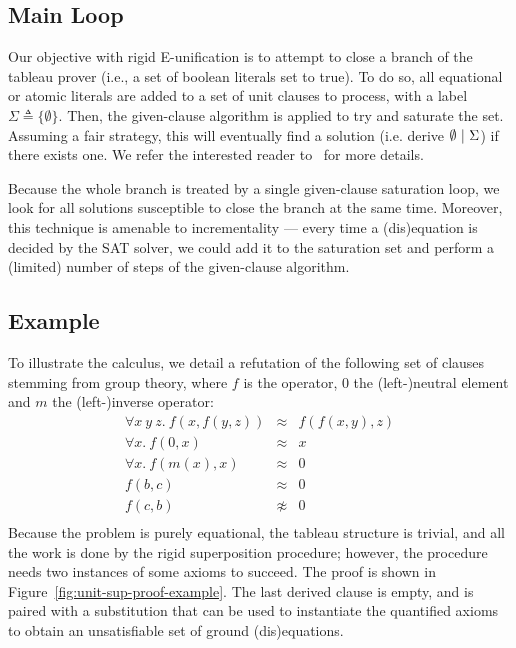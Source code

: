 
\subsection{Main Loop}

Our objective with rigid E-unification is to attempt to close a branch
of the tableau prover (i.e., a set of boolean literals set to true).
To do so, all equational or atomic literals are added to a set of unit clauses
to process, with a label $\Sigma \triangleq \{ \emptyset \}$.
Then, the given-clause algorithm is applied to try and saturate the set.
Assuming a fair strategy, this will eventually find a solution
(i.e. derive $\emptyset  ~|~ \Sigma$) if there exists one.
We refer the interested reader to~\cite{e_brainiac_prover} for more details.

Because the whole branch is treated by a single given-clause saturation loop,
we look for all solutions susceptible to close the branch at the same time.
Moreover, this technique is amenable to incrementality --- every time a
(dis)equation is decided by the SAT solver, we could add it to the saturation
set and perform a (limited) number of steps of the given-clause algorithm.


\subsection{Example}

To illustrate the calculus, we detail a refutation of the following set
of clauses stemming from group theory, where $f$ is the operator, $0$ the
(left-)neutral element and $m$ the (left-)inverse operator:
\[
  \begin{array}{rcl}
    \forall x~y~z.~ f(x,f(y,z)) &\approx& f(f(x,y),z) \\
    \forall x.~ f(0,x) &\approx& x \\
    \forall x.~ f(m(x),x) &\approx& 0 \\
    f(b,c) &\approx& 0 \\
    f(c,b) &\not\approx& 0 \\
  \end{array}
\]
Because the problem is purely equational, the tableau structure is trivial,
and all the work is done by the rigid superposition procedure;
however, the procedure needs two instances of some axioms to succeed.
The proof is shown in Figure~\ref{fig:unit-sup-proof-example}.
The last derived clause is empty, and is paired with a substitution
that can be used to instantiate the quantified axioms to obtain an
unsatisfiable set of ground (dis)equations.

